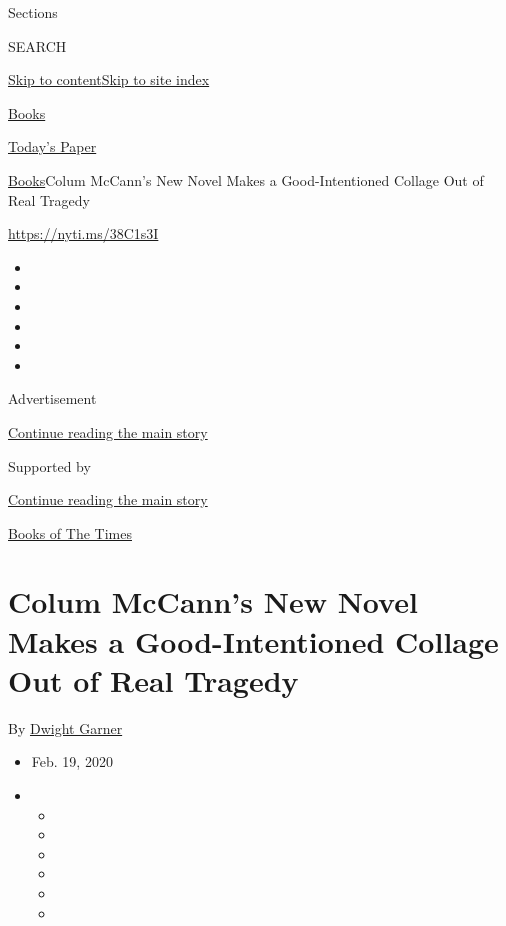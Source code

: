 Sections

SEARCH

\protect\hyperlink{site-content}{Skip to
content}\protect\hyperlink{site-index}{Skip to site index}

\href{https://www.nytimes3xbfgragh.onion/section/books}{Books}

\href{https://myaccount.nytimes3xbfgragh.onion/auth/login?response_type=cookie\&client_id=vi}{}

\href{https://www.nytimes3xbfgragh.onion/section/todayspaper}{Today's
Paper}

\href{/section/books}{Books}\textbar{}Colum McCann's New Novel Makes a
Good-Intentioned Collage Out of Real Tragedy

\url{https://nyti.ms/38C1s3I}

\begin{itemize}
\item
\item
\item
\item
\item
\item
\end{itemize}

Advertisement

\protect\hyperlink{after-top}{Continue reading the main story}

Supported by

\protect\hyperlink{after-sponsor}{Continue reading the main story}

\href{/column/books-of-the-times}{Books of The Times}

\hypertarget{colum-mccanns-new-novel-makes-a-good-intentioned-collage-out-of-real-tragedy}{%
\section{Colum McCann's New Novel Makes a Good-Intentioned Collage Out
of Real
Tragedy}\label{colum-mccanns-new-novel-makes-a-good-intentioned-collage-out-of-real-tragedy}}

By \href{https://www.nytimes3xbfgragh.onion/by/dwight-garner}{Dwight
Garner}

\begin{itemize}
\item
  Feb. 19, 2020
\item
  \begin{itemize}
  \item
  \item
  \item
  \item
  \item
  \item
  \end{itemize}
\end{itemize}

